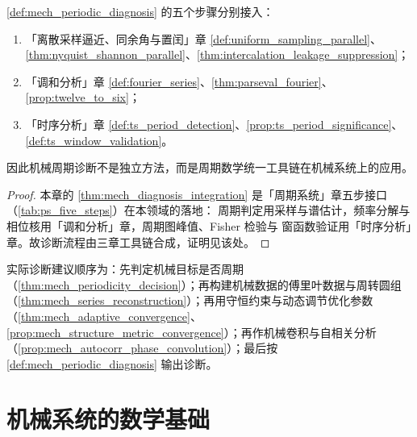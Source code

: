 \begin{theorem}[机械周期诊断流程与三章接口]\label{thm:mech_diagnosis_integration}
\cref{def:mech_periodic_diagnosis} 的五个步骤分别接入：
\begin{enumerate}[label=(\roman*)]
    \item 「离散采样逼近、同余角与置闰」章 \cref{def:uniform_sampling_parallel}、\cref{thm:nyquist_shannon_parallel}、\cref{thm:intercalation_leakage_suppression}；
    \item 「调和分析」章 \cref{def:fourier_series}、\cref{thm:parseval_fourier}、\cref{prop:twelve_to_six}；
    \item 「时序分析」章 \cref{def:ts_period_detection}、\cref{prop:ts_period_significance}、\cref{def:ts_window_validation}。
\end{enumerate}
因此机械周期诊断不是独立方法，而是周期数学统一工具链在机械系统上的应用。
\end{theorem}

\begin{proof}
本章的 \cref{thm:mech_diagnosis_integration} 是「周期系统」章五步接口（\cref{tab:ps_five_steps}）在本领域的落地：
周期判定用采样与谱估计，频率分解与相位核用「调和分析」章，周期图峰值、Fisher 检验与
窗函数验证用「时序分析」章。故诊断流程由三章工具链合成，证明见该处。
\end{proof}

\begin{remark}[整合后的操作顺序]\label{rem:mech_integration_order}
实际诊断建议顺序为：先判定机械目标是否周期（\cref{thm:mech_periodicity_decision}）；再构建机械数据的傅里叶数据与周转圆组（\cref{thm:mech_series_reconstruction}）；再用守恒约束与动态调节优化参数（\cref{thm:mech_adaptive_convergence}、\cref{prop:mech_structure_metric_convergence}）；再作机械卷积与自相关分析（\cref{prop:mech_autocorr_phase_convolution}）；最后按 \cref{def:mech_periodic_diagnosis} 输出诊断。
\end{remark}

\section{机械系统的数学基础}

